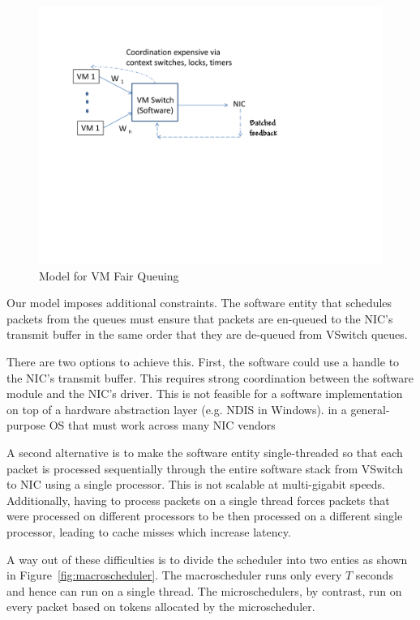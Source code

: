 \begin{figure}
\centering
\includegraphics[width=\columnwidth, trim=6mm 90mm 20mm 10mm]{figures/vmqosmodel}
\caption{Model for VM Fair Queuing}
\label{fig:vmqosmodel}
\vspace{-3mm}
\end{figure}

Our model imposes additional constraints.
The software entity that schedules packets from the queues must
ensure that packets are en-queued to the NIC's transmit buffer in the same order
that they are de-queued from VSwitch queues.  

There are two options to achieve this. First, the software could use a handle to
the NIC's transmit buffer.  This requires strong coordination between the
software module and the NIC's driver.  This is not feasible for a software implementation on top of a
hardware abstraction layer (e.g. NDIS in Windows).
 in a general-purpose OS that must work across many NIC vendors

A second alternative is to make the software entity single-threaded so
that each packet is processed sequentially through the entire software stack
from VSwitch to NIC using a single processor. This is not scalable at
multi-gigabit speeds.  Additionally, having to process packets on a single thread
forces packets that were processed on different processors to be then processed
on a different single processor, leading to cache misses which increase latency.

A way out of these difficulties is to divide the scheduler into two enties as
shown in Figure~\ref{fig:macroscheduler}.   The macroscheduler runs only every
$T$ seconds and hence can run on a single thread.   The microschedulers, by
contrast, run on every packet based on tokens allocated by the microscheduler.   

